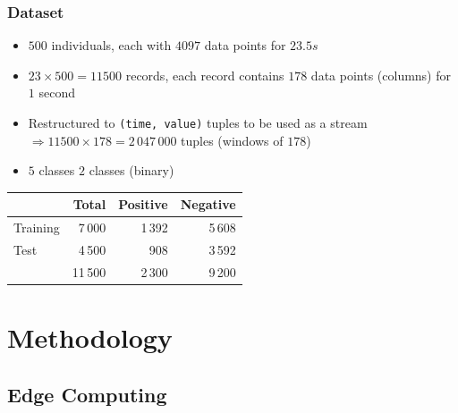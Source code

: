 \documentclass[xelatex,usenames,dvipsnames]{beamer}
\begin{document}
  \begin{frame}
    \frametitle{Dataset}
  \begin{itemize}
    \item \(500\) individuals, each with \(4097\) data points for \(23.5s\) %
    \item \(23 \times 500 = 11500\) records, each record contains \(178\) data points (columns) for \(1\) second
    \item Restructured to \texttt{(time, value)} tuples to be used as a stream \(\Rightarrow 11500 \times 178 = 2\,047\,000\) tuples (windows of \(178\))
    \item \(5\) classes \rightarrow \: \(2\) classes (binary)
  \end{itemize}

  \begin{table}
    {\begin{tabular}{@{} lrrr @{}}
      \toprule
       & Total & Positive & Negative\\
      \midrule
      Training & 7\,000 & 1\,392 & 5\,608\\
      Test & 4\,500& 908 & 3\,592\\
      \addlinespace
      & 11\,500 & 2\,300 & 9\,200\\
      \bottomrule
    \end{tabular}}
  \end{table}

  \end{frame}

  \section{Methodology}
  \subsection{Edge Computing}
  
\end{document}
